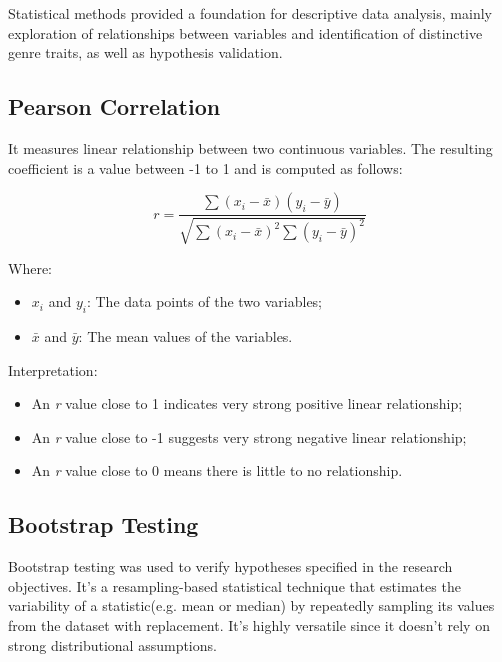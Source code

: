 Statistical methods provided a foundation for descriptive data analysis, mainly
exploration of relationships between variables and identification of distinctive
genre traits, as well as hypothesis validation.

\subsection{Pearson Correlation}

It measures linear relationship between two continuous variables. The resulting
coefficient is a value between -1 to 1 and is computed as follows: 

\[
r = \frac{\sum{(x_i - \bar{x})(y_i - \bar{y})}}{\sqrt{\sum{(x_i - \bar{x})^2} \sum{(y_i - \bar{y})^2}}}
\]

\noindent \noindent Where:
\begin{itemize}
    \item \( x_i \) and \( y_i \): The data points of the two variables;
    \item \( \bar{x} \) and \( \bar{y} \): The mean values of the variables.
\end{itemize}

\noindent \noindent Interpretation:
\begin{itemize}
  \item An \textit{r} value close to 1 indicates very strong positive linear
    relationship;
  \item An \textit{r} value close to -1 suggests very strong negative linear
    relationship;
  \item An \textit{r} value close to 0 means there is little to no relationship.
\end{itemize}



\subsection{Bootstrap Testing}

Bootstrap testing was used to verify hypotheses specified in the research
objectives. It's a resampling-based statistical technique that estimates the
variability of a statistic(e.g. mean or median)  by repeatedly sampling its
values from the dataset with replacement. It's highly versatile since it
doesn't rely on strong distributional assumptions.


